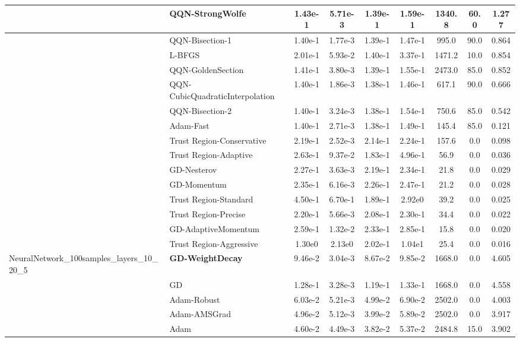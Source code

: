 \documentclass{article}
\begin{document}
\begin{longtable}{|l|l|c|c|c|c|c|c|c|}
\hline
 & QQN-StrongWolfe & 1.43e-1 & 5.71e-3 & 1.39e-1 & 1.59e-1 & 1340.8 & 60.0 & 1.277 \\
\hline
 & QQN-Bisection-1 & 1.40e-1 & 1.77e-3 & 1.39e-1 & 1.47e-1 & 995.0 & 90.0 & 0.864 \\
\hline
 & L-BFGS & 2.01e-1 & 5.93e-2 & 1.40e-1 & 3.37e-1 & 1471.2 & 10.0 & 0.854 \\
\hline
 & QQN-GoldenSection & 1.41e-1 & 3.80e-3 & 1.39e-1 & 1.55e-1 & 2473.0 & 85.0 & 0.852 \\
\hline
 & QQN-CubicQuadraticInterpolation & 1.40e-1 & 1.86e-3 & 1.38e-1 & 1.46e-1 & 617.1 & 90.0 & 0.666 \\
\hline
 & QQN-Bisection-2 & 1.40e-1 & 3.24e-3 & 1.38e-1 & 1.54e-1 & 750.6 & 85.0 & 0.542 \\
\hline
 & Adam-Fast & 1.40e-1 & 2.71e-3 & 1.38e-1 & 1.49e-1 & 145.4 & 85.0 & 0.121 \\
\hline
 & Trust Region-Conservative & 2.19e-1 & 2.52e-3 & 2.14e-1 & 2.24e-1 & 157.6 & 0.0 & 0.098 \\
\hline
 & Trust Region-Adaptive & 2.63e-1 & 9.37e-2 & 1.83e-1 & 4.96e-1 & 56.9 & 0.0 & 0.036 \\
\hline
 & GD-Nesterov & 2.27e-1 & 3.63e-3 & 2.19e-1 & 2.34e-1 & 21.8 & 0.0 & 0.029 \\
\hline
 & GD-Momentum & 2.35e-1 & 6.16e-3 & 2.26e-1 & 2.47e-1 & 21.2 & 0.0 & 0.028 \\
\hline
 & Trust Region-Standard & 4.50e-1 & 6.70e-1 & 1.89e-1 & 2.92e0 & 39.2 & 0.0 & 0.025 \\
\hline
 & Trust Region-Precise & 2.20e-1 & 5.66e-3 & 2.08e-1 & 2.30e-1 & 34.4 & 0.0 & 0.022 \\
\hline
 & GD-AdaptiveMomentum & 2.59e-1 & 1.32e-2 & 2.33e-1 & 2.85e-1 & 15.8 & 0.0 & 0.020 \\
\hline
 & Trust Region-Aggressive & 1.30e0 & 2.13e0 & 2.02e-1 & 1.04e1 & 25.4 & 0.0 & 0.016 \\
NeuralNetwork\_100samples\_layers\_10\_20\_5 & \textbf{GD-WeightDecay} & 9.46e-2 & 3.04e-3 & 8.67e-2 & 9.85e-2 & 1668.0 & 0.0 & 4.605 \\
\hline
 & GD & 1.28e-1 & 3.28e-3 & 1.19e-1 & 1.33e-1 & 1668.0 & 0.0 & 4.558 \\
\hline
 & Adam-Robust & 6.03e-2 & 5.21e-3 & 4.99e-2 & 6.90e-2 & 2502.0 & 0.0 & 4.003 \\
\hline
 & Adam-AMSGrad & 4.96e-2 & 5.12e-3 & 3.99e-2 & 5.89e-2 & 2502.0 & 0.0 & 3.917 \\
\hline
 & Adam & 4.60e-2 & 4.49e-3 & 3.82e-2 & 5.37e-2 & 2484.8 & 15.0 & 3.902 \\

\end{longtable}
\end{document}
